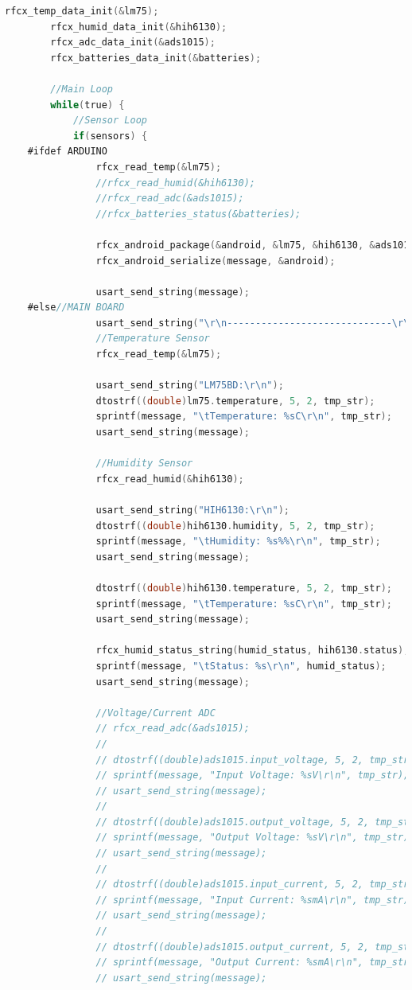 \documentclass{article}
\numberwithin{figure}{section}
\numberwithin{equation}{section}
\begin{document}
{\begin{lstlisting}[language=C,label=lst:rfcx-mcu.c,caption=rfcx-mcu.c]
    	rfcx_temp_data_init(&lm75);
    	rfcx_humid_data_init(&hih6130);
    	rfcx_adc_data_init(&ads1015);
    	rfcx_batteries_data_init(&batteries);

    	//Main Loop
    	while(true) {
    		//Sensor Loop
    		if(sensors) {
    #ifdef ARDUINO
    			rfcx_read_temp(&lm75);
    			//rfcx_read_humid(&hih6130);
    			//rfcx_read_adc(&ads1015);
    			//rfcx_batteries_status(&batteries);

    			rfcx_android_package(&android, &lm75, &hih6130, &ads1015, &batteries);
    			rfcx_android_serialize(message, &android);

    			usart_send_string(message);
    #else//MAIN BOARD
    			usart_send_string("\r\n-----------------------------\r\n");
    			//Temperature Sensor
    			rfcx_read_temp(&lm75);

    			usart_send_string("LM75BD:\r\n");
    			dtostrf((double)lm75.temperature, 5, 2, tmp_str);
    			sprintf(message, "\tTemperature: %sC\r\n", tmp_str);
    			usart_send_string(message);

    			//Humidity Sensor
    			rfcx_read_humid(&hih6130);

    			usart_send_string("HIH6130:\r\n");
    			dtostrf((double)hih6130.humidity, 5, 2, tmp_str);
    			sprintf(message, "\tHumidity: %s%%\r\n", tmp_str);
    			usart_send_string(message);

    			dtostrf((double)hih6130.temperature, 5, 2, tmp_str);
    			sprintf(message, "\tTemperature: %sC\r\n", tmp_str);
    			usart_send_string(message);

    			rfcx_humid_status_string(humid_status, hih6130.status);
    			sprintf(message, "\tStatus: %s\r\n", humid_status);
    			usart_send_string(message);

    			//Voltage/Current ADC
    			// rfcx_read_adc(&ads1015);
    			//
    			// dtostrf((double)ads1015.input_voltage, 5, 2, tmp_str);
    			// sprintf(message, "Input Voltage: %sV\r\n", tmp_str);
    			// usart_send_string(message);
    			//
    			// dtostrf((double)ads1015.output_voltage, 5, 2, tmp_str);
    			// sprintf(message, "Output Voltage: %sV\r\n", tmp_str);
    			// usart_send_string(message);
    			//
    			// dtostrf((double)ads1015.input_current, 5, 2, tmp_str);
    			// sprintf(message, "Input Current: %smA\r\n", tmp_str);
    			// usart_send_string(message);
    			//
    			// dtostrf((double)ads1015.output_current, 5, 2, tmp_str);
    			// sprintf(message, "Output Current: %smA\r\n", tmp_str);
    			// usart_send_string(message);


\end{lstlisting}}
\end{document}
